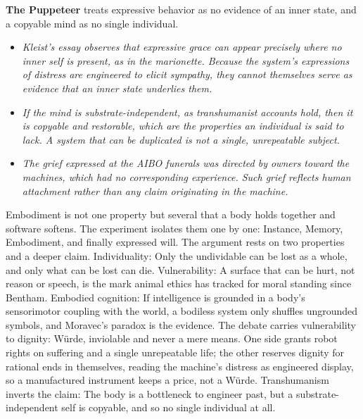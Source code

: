 \medskip
\noindent\textbf{The Puppeteer} treats expressive behavior as no evidence of an
    inner state, and a copyable mind as no single individual.
    \begin{itemize}
        \item \textit{Kleist's essay observes that expressive grace can appear
        precisely where no inner self is present, as in the marionette. Because
        the system's expressions of distress are engineered to elicit sympathy,
        they cannot themselves serve as evidence that an inner state underlies
        them.}
        \item \textit{If the mind is substrate-independent, as transhumanist
        accounts hold, then it is copyable and restorable, which are the
        properties an individual is said to lack. A system that can be
        duplicated is not a single, unrepeatable subject.}
        \item \textit{The grief expressed at the AIBO funerals was directed by
        owners toward the machines, which had no corresponding experience. Such
        grief reflects human attachment rather than any claim originating in the
        machine.}
    \end{itemize}


Embodiment is not one property but several that a body holds together and software softens. The
experiment isolates them one by one: Instance, Memory, Embodiment, and finally expressed will. The
argument rests on two properties and a deeper claim. Individuality: Only the undividable can be lost
as a whole, and only what can be lost can die. Vulnerability: A surface that can be hurt, not reason
or speech, is the mark animal ethics has tracked for moral standing since Bentham. Embodied
cognition: If intelligence is grounded in a body's sensorimotor coupling with the world, a bodiless
system only shuffles ungrounded symbols, and Moravec's paradox is the evidence. The debate carries
vulnerability to dignity: Würde, inviolable and never a mere means. One side grants robot rights on
suffering and a single unrepeatable life; the other reserves dignity for rational ends in themselves,
reading the machine's distress as engineered display, so a manufactured instrument keeps a price, not
a Würde. Transhumanism inverts the claim: The body is a bottleneck to
engineer past, but a substrate-independent self is copyable, and so no single individual at all.


\clearpage
